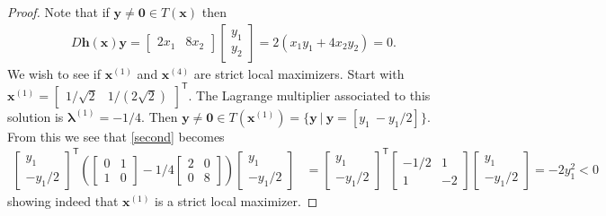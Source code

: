 \documentclass[12pt]{article}
\theoremstyle{definition}
\newcommand{\vc}[1]{\boldsymbol{#1}}
\newcommand{\tran}{\mathsf{T}}
\begin{document}
\begin{proof}
  Note that if $\vc{y} \neq \vc{0} \in T(\vc{x})$ then
  \begin{align*}
    D\vc{h}(\vc{x})\vc{y} = \begin{bmatrix}2x_1 & 8x_2\end{bmatrix}\begin{bmatrix}y_1 \\ y_2\end{bmatrix} = 2(x_1y_1 + 4x_2y_2) = 0.
  \end{align*}
  We wish to see if $\vc{x}^{(1)}$ and $\vc{x}^{(4)}$ are strict local maximizers. Start with $\vc{x}^{(1)} = \begin{bmatrix}1/\sqrt{2} & 1/(2\sqrt{2})\end{bmatrix}^\tran$.
  The Lagrange multiplier associated to this solution is $\vc{\lambda}^{(1)} = -1/4$. Then $\vc{y} \neq \vc{0} \in T(\vc{x}^{(1)}) = \{\vc{y}\ |\  \vc{y} = [y_1 \ -y_1/2]\}$. From this we see that \eqref{second} becomes
  \begin{align*}
    \begin{bmatrix}y_1 \\ -y_1/2\end{bmatrix}^\tran\left(\begin{bmatrix}0 & 1 \\ 1 & 0\end{bmatrix} - 1/4\begin{bmatrix}2 & 0 \\ 0 &8\end{bmatrix}\right)\begin{bmatrix}y_1 \\ -y_1/2\end{bmatrix} &=
    \begin{bmatrix}y_1 \\ -y_1/2\end{bmatrix}^\tran\begin{bmatrix}-1/2 & 1 \\ 1 & -2\end{bmatrix}\begin{bmatrix}y_1 \\ -y_1/2\end{bmatrix} = -2y_1^2 < 0
  \end{align*}
  showing indeed that $\vc{x}^{(1)}$ is a strict local maximizer.


\end{proof}
\end{document}
